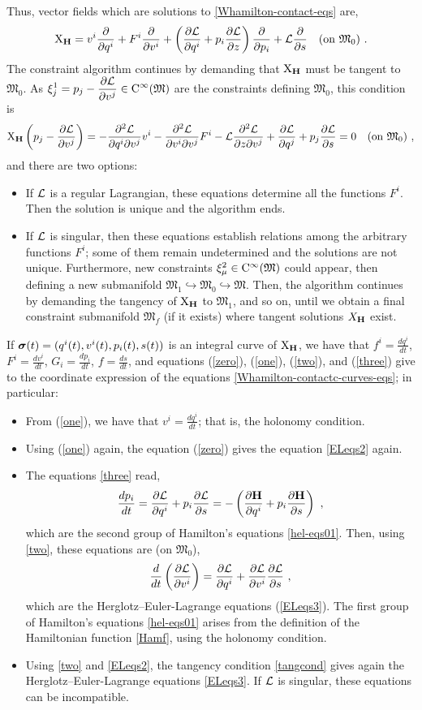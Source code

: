 \documentclass[12pt]{report}
\def\beq{\begin{equation}}
\def\eeq{\end{equation}}
\def\bit{\begin{itemize}}
\def\eit{\end{itemize}}
\def\dst{\displaystyle}
\def\derpar#1#2{\frac{\partial{#1}}{\partial{#2}}}
\def\Lag{{\cal L}}
\def\X{{\rm X}}
\def\Cinfty{{\rm C}^\infty}
\begin{document}
Thus, vector fields which are solutions to \eqref{Whamilton-contact-eqs} are,
$$
\X_{\bf H}=
v^i\derpar{}{q^i}+F^i\derpar{}{v^i}+
\left(\derpar{\Lag}{q^i}
+p_i\derpar{\Lag}{z}\right)\derpar{}{p_i}
+\Lag\derpar{}{s} 
\quad \mbox{\rm (on $\mathfrak{M}_0$)}\ .
$$
The constraint algorithm continues by demanding that
$\X_{\bf H}$ must be tangent to $\mathfrak{M}_0$. As 
$\displaystyle \xi^1_j=p_j-\derpar{\Lag}{v^j}\in\Cinfty(\mathfrak{M})$
are the constraints defining $\mathfrak{M}_0$, this condition is
\beq
\X_{\bf H}\left(p_j-\derpar{\Lag}{v^j}\right)=
-\frac{\partial^2\Lag}{\partial q^i\partial v^j}v^i
-\frac{\partial^2\Lag}{\partial v^i\partial  v^j}F^i-
\Lag\frac{\partial^2\Lag}{\partial z\partial v^j}
+\derpar{\Lag}{q^j}+p_j\derpar{\Lag}{s}=0
\quad \mbox{\rm (on $\mathfrak{M}_0$)} \ ,
\label{tangcond}
\eeq
and there are two options:
\bit
\item
If $\Lag$ is a regular Lagrangian, these equations determine all the
functions \(F^i\).
Then the solution is unique and the algorithm ends.
\item
If $\Lag$ is singular, then these equations establish relations
among the arbitrary functions $F^i$;
some of them remain undetermined and the solutions are not unique.
Furthermore, new constraints $\xi^2_\mu\in\Cinfty(\mathfrak{M})$
could appear, then defining a new submanifold 
$\mathfrak{M}_1\hookrightarrow\mathfrak{M}_0\hookrightarrow\mathfrak{M}$.
Then, the algorithm continues by demanding the tangency of
$\X_{\bf H}$ to $\mathfrak{M}_1$, and so on,
until we obtain a final constraint submanifold $\mathfrak{M}_f$ (if it exists)
where tangent solutions $X_{\bf H}$ exist.
\eit
If $\mbox{\boldmath $\sigma$}(t)=(q^i(t),v^i(t),p_i(t),s(t))$ 
is an integral curve of $\X_{\bf H}$, we have that 
$\displaystyle f^i=\frac{d q^i}{d t}$,
$\displaystyle F^i=\frac{d v^i}{d t}$, 
$\displaystyle G_i=\frac{d p_i}{d t}$,
$\displaystyle f=\frac{d s}{d t}$, 
and equations (\ref{zero}), (\ref{one}), (\ref{two}), and (\ref{three}) 
give to the coordinate expression of the equations
\eqref{Whamilton-contactc-curves-eqs}; in particular:
\bit
\item
From (\ref{one}), we have that $\dst v^i=\frac{d q^i}{d t}$;
that is, the holonomy condition.
\item
Using (\ref{one}) again, the equation (\ref{zero}) gives the equation \eqref{ELeqs2} again.
\item
The equations \eqref{three} read,
$$
\frac{dp_i}{dt}=\derpar{\Lag}{q^i}+p_i\derpar{\Lag}{s}=
-\left(\derpar{{\bf H}}{q^i}+p_i\derpar{{\bf H}}{s}\right) \ ,
$$
which are the second group of Hamilton's equations \eqref{hel-eqs01}.
Then, using \eqref{two},
these equations are (on $\mathfrak{M}_0$),
$$
\frac{d}{dt}\left(\derpar{\Lag}{v^i}\right)=\derpar{\Lag}{q^i}
+\derpar{\Lag}{v^i} \derpar{\Lag}{s} \ ,
$$
which are the Herglotz--Euler-Lagrange equations (\ref{ELeqs3}).
The first group of Hamilton's equations \eqref{hel-eqs01} arises
from the definition of the Hamiltonian function
\eqref{Hamf}, using the holonomy condition.
\item
Using \eqref{two} and \eqref{ELeqs2},
the tangency condition \eqref{tangcond} gives
again the Herglotz--Euler-Lagrange equations \eqref{ELeqs3}.
If $\Lag$ is singular, these equations can be incompatible.
\eit
\end{document}
